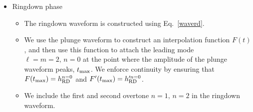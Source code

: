 \begin{itemize}
\item{Ringdown phase}
\begin{itemize}
\item The ringdown waveform is constructed using Eq.~\eqref{waverd}.
\item We use the plunge waveform to construct an interpolation function \(F(t)\), and then use this function to attach the leading mode \(\ell=m=2,\, n=0\) at the point where the amplitude of the plunge waveform peaks, \(t_{\rm{max}}\). We enforce continuity by ensuring that \(F( t_{\rm{max}}) = h^{n=0}_{\rm{RD}}\) and  \(F'( t_{\rm{max}}) = h'^{n=0}_{\rm{RD}}\).
\item We include the first and second overtone \(n=1,\, n=2\) in the ringdown waveform.
\end{itemize}
\end{itemize}

